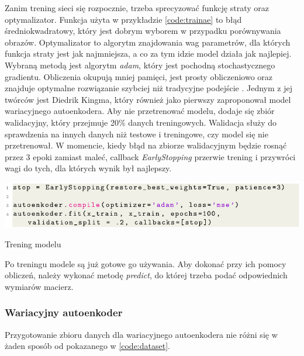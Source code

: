 \documentclass[a4paper,12pt,oneside]{book} %
\begin{document}
Zanim trening sieci się rozpocznie, trzeba sprecyzować funkcję straty oraz optymalizator. Funkcja użyta w przykładzie \ref{code:trainae} to błąd średniokwadratowy, który jest dobrym wyborem w przypadku porównywania obrazów. Optymalizator to algorytm znajdowania wag parametrów, dla których funkcja straty jest jak najmniejsza, a co za tym idzie model działa jak najlepiej. Wybraną metodą jest algorytm \textit{adam}, który jest pochodną stochastycznego gradientu. Obliczenia okupują mniej pamięci, jest prosty obliczeniowo oraz znajduje optymalne rozwiązanie szybciej niż tradycyjne podejście \cite{adam}. Jednym z jej twórców jest Diedrik Kingma, który również jako pierwszy zaproponował model wariacyjnego autoenkodera. Aby nie przetrenować modelu, dodaje się zbiór walidacyjny, który przejmuje 20\% danych treningowych. Walidacja służy do sprawdzenia na innych danych niż testowe i treningowe, czy model się nie przetrenował. W momencie, kiedy błąd na zbiorze walidacyjnym będzie rosnąć przez 3 epoki zamiast maleć, callback \textit{EarlyStopping} przerwie trening i przywróci wagi do tych, dla których wynik był najlepszy.
\begin{code}[h!]
	\centering
	\includegraphics[width=\linewidth]{trainae.pdf}
	\caption{Trening modelu}
	\label{code:trainae}
\end{code}

Po treningu modele są już gotowe go używania. Aby dokonać przy ich pomocy obliczeń, należy wykonać metodę \textit{predict}, do której trzeba podać odpowiednich wymiarów macierz. 
\subsubsection{Wariacyjny autoenkoder}
Przygotowanie zbioru danych dla wariacyjnego autoenkodera nie różni się w żaden sposób od pokazanego w \ref{code:dataset}. 
\end{document}
